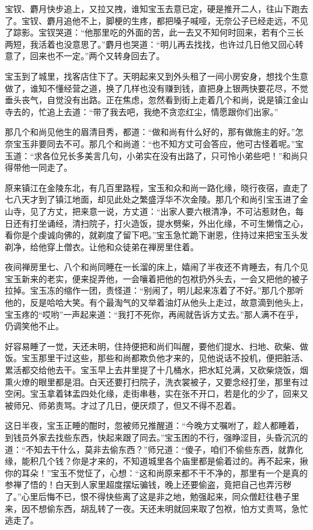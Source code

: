 \documentclass[12pt,oneside]{book}
\begin{document}
宝钗、麝月快步追上，又拉又拽，谁知宝玉去意已定，硬是推开二人，往山下跑去了。宝钗、麝月追他不上，脚梗的生疼，都把嗓子喊哑，无奈公子已经走远，不见了踪影。宝钗哭道：“他那里吃的外面的苦，此一去又不知何时回来，若有个三长两短，我活着也没意思了。”麝月也哭道：“明儿再去找找，也许过几日他又回心转意了，回来也不一定。”两个又转身回去了。

宝玉到了城里，找客店住下了。天明起来又到外头租了一间小房安身，想找个生意做了，谁知不懂经营之道，换了几样也没有赚到钱，直把身上银两快要花尽，不觉垂头丧气，自觉没有出路。正在焦虑，忽然看到街上走着几个和尚，说是镇江金山寺去的，忙追上去道：“带了我去吧，我绝不贪恋红尘，情愿跟你们出家。”

那几个和尚见他生的眉清目秀，都道：“做和尚有什么好的，那有做施主的好。”怎奈宝玉非要同去不可。那几个和尚道：“也不知方丈可会答应，他可古怪着呢。”宝玉道：“求各位兄长多美言几句，小弟实在没有出路了，只可怜小弟些吧！”和尚只得带他一同走了。

原来镇江在金陵东北，有几百里路程，宝玉和众和尚一路化缘，晓行夜宿，直走了七八天才到了镇江地面，却见此处之繁盛浮华不次金陵。那几个和尚引宝玉进了金山寺，见了方丈，把来意一说，方丈道：“出家人要六根清净，不可沾惹财色，每日还有打坐诵经，清扫院子，打火造饭，提水劈柴，外出化缘，不可生懒惰之心，看你是个虔诚向佛的，就剃度了留下吧。”宝玉急忙跪下谢恩，住持过来把宝玉头发剃净，给他穿上僧衣。让他和众徒弟在禅房里住着。

夜间禅房里七、八个和尚同睡在一长溜的床上，嬉闹了半夜还不肯睡去，有几个见宝玉新来的老实，便来捉弄他，一会嚷着把他的包袱扔外头去，一会又把他的被子拉掉。宝玉冻的缩作一团，责怪道：“别闹了，明儿起来冻着了不好。”那几个那听他的，反是哈哈大笑。有个最淘气的又举着油灯从他头上走过，故意滴到他头上，宝玉疼的“哎哟”一声起来道：“我打不死你，再闹就告诉方丈去。”那人满不在乎，仍调笑他不止。

好容易睡了一觉，天还未明，住持便把和尚们叫醒，要他们提水、扫地、砍柴、做饭。宝玉那里干过这些，那些和尚都欺负他才来的，见他说话不投机，便把脏活、累活都交给他去干。宝玉早上去井里提了十几桶水，把水缸兑满，又砍柴烧饭，烟熏火燎的眼里都是泪。白天还要打扫院子，洗衣裳被子，又要念经打坐，那里有过空闲。宝玉拿着钵盂四处化缘，走街串巷，实在张不开口，若是化的少了，回来又被师兄、师弟责骂。才过了几日，便厌烦了，但又不得不忍着。

这日半夜，宝玉正睡的酣时，忽被师兄推醒道：“今晚方丈嘱咐了，趁人都睡着，到钱员外家去找些东西，快起来跟了同去。”宝玉困的不行，强睁涩目，头昏沉沉的道：“不知去干什么，莫非去偷东西？”师兄道：“傻子，咱们不偷些东西，就靠化缘，能积几个钱？你是才来的，不知道城里各个庙里都是偷着过的。再不起来，揪你的耳朵！”宝玉不觉怔了，心想：“这和尚原来都不干不净的，那里有一个是真的参禅了悟的！白天到人家里超度摆坛骗钱，晚上还要偷盗，竟把自己也弄污秽了。”心里后悔不已，恨不得快些离了这是非之地，勉强起来，同众僧赶往巷子里来，因不想偷东西，胡乱转了一夜。天还未明就回来取了包袱，怕方丈责骂，急忙逃走了。
\end{document}
